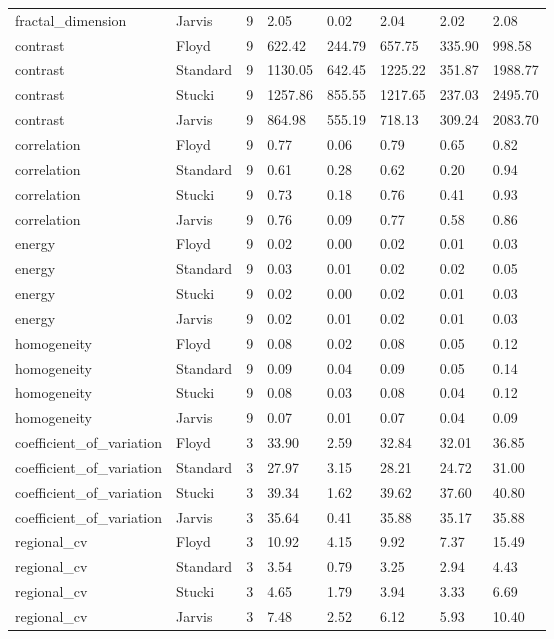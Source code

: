 \begin{tabular}{llrlllll}
fractal_dimension & Jarvis & 9 & 2.05 & 0.02 & 2.04 & 2.02 & 2.08 \\
contrast & Floyd & 9 & 622.42 & 244.79 & 657.75 & 335.90 & 998.58 \\
contrast & Standard & 9 & 1130.05 & 642.45 & 1225.22 & 351.87 & 1988.77 \\
contrast & Stucki & 9 & 1257.86 & 855.55 & 1217.65 & 237.03 & 2495.70 \\
contrast & Jarvis & 9 & 864.98 & 555.19 & 718.13 & 309.24 & 2083.70 \\
correlation & Floyd & 9 & 0.77 & 0.06 & 0.79 & 0.65 & 0.82 \\
correlation & Standard & 9 & 0.61 & 0.28 & 0.62 & 0.20 & 0.94 \\
correlation & Stucki & 9 & 0.73 & 0.18 & 0.76 & 0.41 & 0.93 \\
correlation & Jarvis & 9 & 0.76 & 0.09 & 0.77 & 0.58 & 0.86 \\
energy & Floyd & 9 & 0.02 & 0.00 & 0.02 & 0.01 & 0.03 \\
energy & Standard & 9 & 0.03 & 0.01 & 0.02 & 0.02 & 0.05 \\
energy & Stucki & 9 & 0.02 & 0.00 & 0.02 & 0.01 & 0.03 \\
energy & Jarvis & 9 & 0.02 & 0.01 & 0.02 & 0.01 & 0.03 \\
homogeneity & Floyd & 9 & 0.08 & 0.02 & 0.08 & 0.05 & 0.12 \\
homogeneity & Standard & 9 & 0.09 & 0.04 & 0.09 & 0.05 & 0.14 \\
homogeneity & Stucki & 9 & 0.08 & 0.03 & 0.08 & 0.04 & 0.12 \\
homogeneity & Jarvis & 9 & 0.07 & 0.01 & 0.07 & 0.04 & 0.09 \\
coefficient_of_variation & Floyd & 3 & 33.90 & 2.59 & 32.84 & 32.01 & 36.85 \\
coefficient_of_variation & Standard & 3 & 27.97 & 3.15 & 28.21 & 24.72 & 31.00 \\
coefficient_of_variation & Stucki & 3 & 39.34 & 1.62 & 39.62 & 37.60 & 40.80 \\
coefficient_of_variation & Jarvis & 3 & 35.64 & 0.41 & 35.88 & 35.17 & 35.88 \\
regional_cv & Floyd & 3 & 10.92 & 4.15 & 9.92 & 7.37 & 15.49 \\
regional_cv & Standard & 3 & 3.54 & 0.79 & 3.25 & 2.94 & 4.43 \\
regional_cv & Stucki & 3 & 4.65 & 1.79 & 3.94 & 3.33 & 6.69 \\
regional_cv & Jarvis & 3 & 7.48 & 2.52 & 6.12 & 5.93 & 10.40 \\

\end{tabular}
